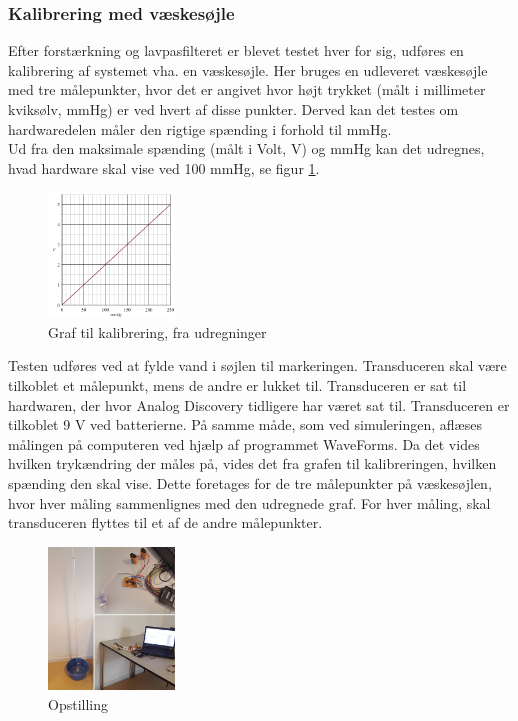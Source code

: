 \subsubsection{Kalibrering med væskesøjle}
Efter forstærkning og lavpasfilteret er blevet testet hver for sig, udføres en kalibrering af systemet vha. en væskesøjle. Her bruges en udleveret væskesøjle med tre målepunkter, hvor det er angivet hvor højt trykket (målt i millimeter kviksølv, mmHg) er ved hvert af disse punkter. Derved kan det testes om hardwaredelen måler den rigtige spænding i forhold til mmHg. \\
Ud fra den maksimale spænding (målt i Volt, V) og mmHg kan det udregnes, hvad hardware skal vise ved 100 mmHg, se figur \ref{fig:graf_vandtest}. 
\begin{figure}[H]
	\centering
	\includegraphics[width=0.3\textwidth]{Figurer/graf_vandtest}
	\caption{Graf til kalibrering, fra udregninger}
	\label{fig:graf_vandtest}
\end{figure}
Testen udføres ved at fylde vand i søjlen til markeringen. Transduceren skal være tilkoblet et målepunkt, mens de andre er lukket til. Transduceren er sat til hardwaren, der hvor Analog Discovery tidligere har været sat til. Transduceren er tilkoblet 9 V ved batterierne. På samme måde, som ved simuleringen, aflæses målingen på computeren ved hjælp af programmet WaveForms. Da det vides hvilken trykændring der måles på, vides det fra grafen til kalibreringen, hvilken spænding den skal vise. Dette foretages for de tre målepunkter på væskesøjlen, hvor hver måling sammenlignes med den udregnede graf. For hver måling, skal transduceren flyttes til et af de andre målepunkter.  
\begin{figure}[H]
	\centering
	\includegraphics[width=0.3\textwidth]{Figurer/vandtest_opstilling}
	\caption{Opstilling}
	\label{fig:vandtest_opstilling}
\end{figure} 
